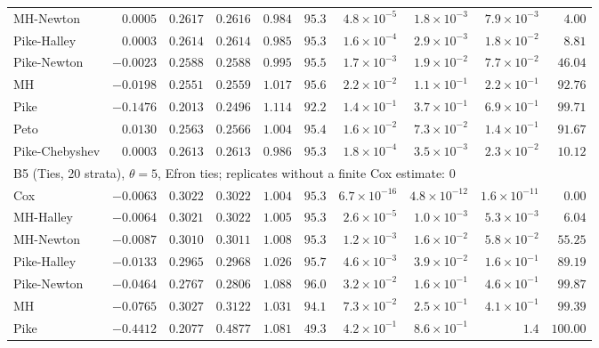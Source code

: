 \begin{landscape}
\begin{longtable}{lrrrrrrrrr}
MH-Newton & $0.0005$ & $0.2617$ & $0.2616$ & $0.984$ & $95.3$ & $4.8 \times 10^{-5}$ & $1.8 \times 10^{-3}$ & $7.9 \times 10^{-3}$ & $4.00$ \\
Pike-Halley & $0.0003$ & $0.2614$ & $0.2614$ & $0.985$ & $95.3$ & $1.6 \times 10^{-4}$ & $2.9 \times 10^{-3}$ & $1.8 \times 10^{-2}$ & $8.81$ \\
Pike-Newton & $-0.0023$ & $0.2588$ & $0.2588$ & $0.995$ & $95.5$ & $1.7 \times 10^{-3}$ & $1.9 \times 10^{-2}$ & $7.7 \times 10^{-2}$ & $46.04$ \\
MH & $-0.0198$ & $0.2551$ & $0.2559$ & $1.017$ & $95.6$ & $2.2 \times 10^{-2}$ & $1.1 \times 10^{-1}$ & $2.2 \times 10^{-1}$ & $92.76$ \\
Pike & $-0.1476$ & $0.2013$ & $0.2496$ & $1.114$ & $92.2$ & $1.4 \times 10^{-1}$ & $3.7 \times 10^{-1}$ & $6.9 \times 10^{-1}$ & $99.71$ \\
Peto & $0.0130$ & $0.2563$ & $0.2566$ & $1.004$ & $95.4$ & $1.6 \times 10^{-2}$ & $7.3 \times 10^{-2}$ & $1.4 \times 10^{-1}$ & $91.67$ \\
Pike-Chebyshev & $0.0003$ & $0.2613$ & $0.2613$ & $0.986$ & $95.3$ & $1.8 \times 10^{-4}$ & $3.5 \times 10^{-3}$ & $2.3 \times 10^{-2}$ & $10.12$ \\
\multicolumn{10}{l}{B5 (Ties, 20 strata), $\theta = 5$, Efron ties; replicates without a finite Cox estimate: 0} \\
Cox & $-0.0063$ & $0.3022$ & $0.3022$ & $1.004$ & $95.3$ & $6.7 \times 10^{-16}$ & $4.8 \times 10^{-12}$ & $1.6 \times 10^{-11}$ & $0.00$ \\
MH-Halley & $-0.0064$ & $0.3021$ & $0.3022$ & $1.005$ & $95.3$ & $2.6 \times 10^{-5}$ & $1.0 \times 10^{-3}$ & $5.3 \times 10^{-3}$ & $6.04$ \\
MH-Newton & $-0.0087$ & $0.3010$ & $0.3011$ & $1.008$ & $95.3$ & $1.2 \times 10^{-3}$ & $1.6 \times 10^{-2}$ & $5.8 \times 10^{-2}$ & $55.25$ \\
Pike-Halley & $-0.0133$ & $0.2965$ & $0.2968$ & $1.026$ & $95.7$ & $4.6 \times 10^{-3}$ & $3.9 \times 10^{-2}$ & $1.6 \times 10^{-1}$ & $89.19$ \\
Pike-Newton & $-0.0464$ & $0.2767$ & $0.2806$ & $1.088$ & $96.0$ & $3.2 \times 10^{-2}$ & $1.6 \times 10^{-1}$ & $4.6 \times 10^{-1}$ & $99.87$ \\
MH & $-0.0765$ & $0.3027$ & $0.3122$ & $1.031$ & $94.1$ & $7.3 \times 10^{-2}$ & $2.5 \times 10^{-1}$ & $4.1 \times 10^{-1}$ & $99.39$ \\
Pike & $-0.4412$ & $0.2077$ & $0.4877$ & $1.081$ & $49.3$ & $4.2 \times 10^{-1}$ & $8.6 \times 10^{-1}$ & $1.4$ & $100.00$ \\

\end{longtable}
\end{landscape}
